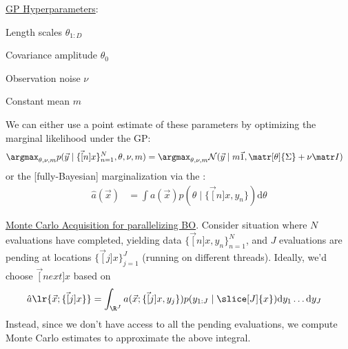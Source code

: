 \documentclass[11pt]{article}
\begin{document}
\underline{GP Hyperparameters}:
\begin{compactitem}
	\item Length scales $\theta_{1:D}$
	\item Covariance amplitude $\theta_0$
	\item Observation noise $\nu$
	\item Constant mean $m$ 
\end{compactitem}
We can either use a point estimate of these parameters by optimizing the marginal likelihood under the GP:
\begin{align}
	\argmax_{\theta, \nu, m} p(\vec{y} \mid \{ \vec[n]{x} \}_{n=1}^N , \theta , \nu, m) 
		&=\argmax_{\theta, \nu, m}  \mathcal{N}(\vec y \mid m \vec 1, \matr[\theta]{\Sigma} + \nu \matr I)
\end{align}
or the [fully-Bayesian] marginalization via the :
\begin{align}
	\hat{a} (\vec x)
		&= \int a(\vec x) p(\theta \mid \{\vec[n]{x}, y_n\}) \mathrm{d} \theta 
\end{align}

\underline{Monte Carlo Acquisition for parallelizing BO}. Consider situation where $N$ evaluations have completed, yielding data $\{ \vec[n]{x}, y_n \}_{n=1}^{N}$, and $J$ evaluations are pending at locations $\{ \vec[j]{x} \}_{j=1}^{J}$ (running on different threads). Ideally, we'd choose $\vec[next]{x}$ based on 
\begin{align}
	\hat{a}\lr{ \vec x ; \{ \vec[j]{x} \}}
		&= \int_{\R^J} a(\vec x; \{\vec[j]{x}, y_j\}) p( y_{1:J} \mid \slice[J]{x} ) \mathrm{d}y_1 \ldots \mathrm{d}y_J
\end{align}
Instead, since we don't have access to all the pending evaluations, we compute Monte Carlo estimates to approximate the above integral.


\myspace 
{} 
\myspace
\end{document}
